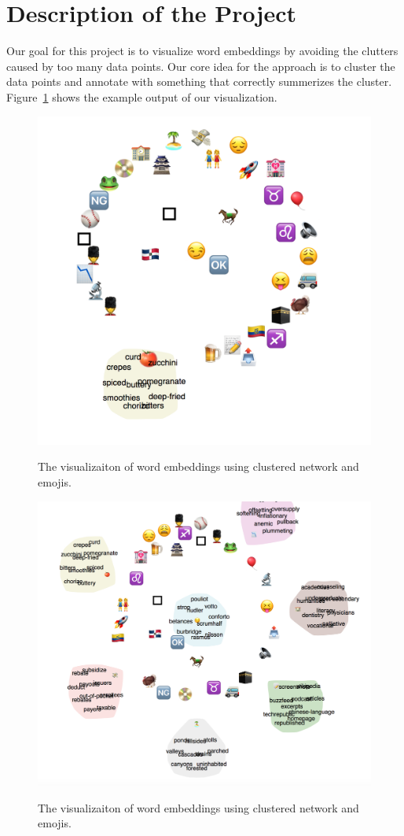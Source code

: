 \section{Description of the Project}
Our goal for this project is to visualize word embeddings by avoiding the clutters caused by too many data points. 
Our core idea for the approach is to cluster the data points and annotate with something that correctly summerizes the cluster. 
Figure~\ref{fig:cluster_network} shows the example output of our visualization. 

\begin{figure}[htb]
 \centering
     {\includegraphics[width=0.68\linewidth]{figures/clustered_network.png}}
    \vspace{-1ex}
     \caption{The visualizaiton of word embeddings using clustered network and emojis.}
\label{fig:cluster_network}
\end{figure}

\begin{figure}[htb]
 \centering
     {\includegraphics[width=0.68\linewidth]{figures/clustered_network_opened.png}}
    \vspace{-1ex}
     \caption{The visualizaiton of word embeddings using clustered network and emojis.}
\label{fig:cluster_network_opened}
\end{figure}

